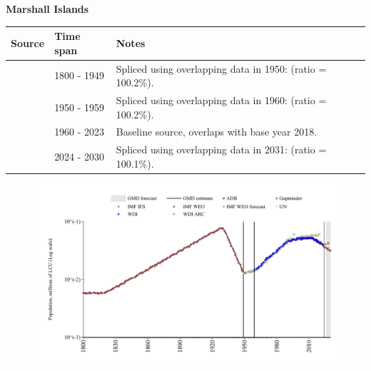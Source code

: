 \documentclass[12pt,a4paper,landscape]{article}
\begin{document}
\begin{adjustbox}{max totalsize={\paperwidth}{\paperheight},center}
\begin{minipage}[t][\textheight][t]{\textwidth}
\vspace*{0.5cm}
{}
\begin{center}
{\Large\bfseries Marshall Islands}
\end{center}
\vspace{0.5cm}
\begin{table}[H]
\centering
\small
\begin{tabular}{|l|l|l|}
\hline
\textbf{Source} & \textbf{Time span} & \textbf{Notes} \\
\hline
\rowcolor{white}\cite{Gapminder}& 1800 - 1949 &Spliced using overlapping data in 1950: (ratio = 100.2\%).\\
\rowcolor{lightgray}\cite{IMF_IFS}& 1950 - 1959 &Spliced using overlapping data in 1960: (ratio = 100.2\%).\\
\rowcolor{white}\cite{WDI}& 1960 - 2023 &Baseline source, overlaps with base year 2018.\\
\rowcolor{lightgray}\cite{Gapminder}& 2024 - 2030 &Spliced using overlapping data in 2031: (ratio = 100.1\%).\\
\hline
\end{tabular}
\end{table}
\begin{figure}[H]
\centering
\includegraphics[width=\textwidth,height=0.6\textheight,keepaspectratio]{graphs/MHL_pop.pdf}
\end{figure}
\end{minipage}
\end{adjustbox}
\end{document}
